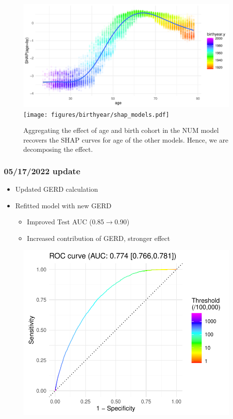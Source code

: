 \documentclass[12pt]{article}
\begin{document}
\begin{figure}[h]
\centering
\includegraphics[width=1.0\textwidth]{figures/birthyear/shap_num_age_by.pdf}
\texttt{[image: figures/birthyear/shap\_models.pdf]}
\caption{Aggregating the effect of age and birth cohort in the NUM model
recovers the SHAP curves for age of the other models. Hence, we are decomposing the 
effect.}
\end{figure}



\clearpage
\pagebreak
\subsubsection*{05/17/2022 update}

\begin{itemize}
	\item Updated GERD calculation
	\item Refitted model with new GERD
	\begin{itemize}
		\item Improved Test AUC (0.85$\to$0.90)
		\item Increased contribution of GERD, stronger effect
	\end{itemize}	 
\end{itemize}

\begin{figure}[h]
\centering
\includegraphics[width=1.0\textwidth]{figures/roc.pdf}
\end{figure}
\end{document}
